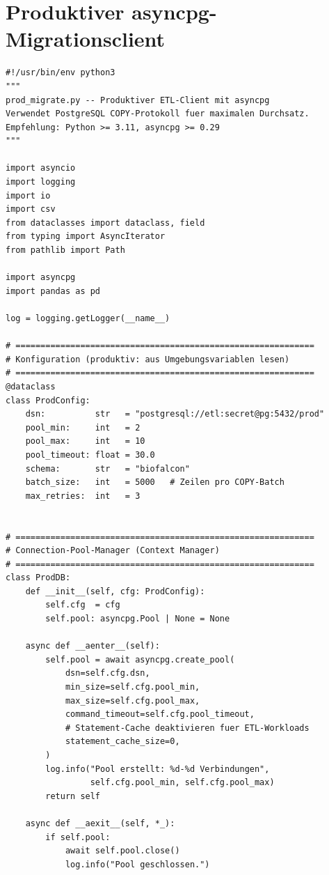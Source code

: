 \documentclass[12pt,a4paper]{report}
\theoremstyle{definition}
\theoremstyle{remark}
\begin{document}
\section{Produktiver asyncpg-Migrationsclient}

\begin{lstlisting}[style=python, caption={prod\_migrate.py: Asynchroner Produktiv-Client mit Connection Pool}, label=lst:asyncpg]
#!/usr/bin/env python3
"""
prod_migrate.py -- Produktiver ETL-Client mit asyncpg
Verwendet PostgreSQL COPY-Protokoll fuer maximalen Durchsatz.
Empfehlung: Python >= 3.11, asyncpg >= 0.29
"""

import asyncio
import logging
import io
import csv
from dataclasses import dataclass, field
from typing import AsyncIterator
from pathlib import Path

import asyncpg
import pandas as pd

log = logging.getLogger(__name__)

# ============================================================
# Konfiguration (produktiv: aus Umgebungsvariablen lesen)
# ============================================================
@dataclass
class ProdConfig:
    dsn:          str   = "postgresql://etl:secret@pg:5432/prod"
    pool_min:     int   = 2
    pool_max:     int   = 10
    pool_timeout: float = 30.0
    schema:       str   = "biofalcon"
    batch_size:   int   = 5000   # Zeilen pro COPY-Batch
    max_retries:  int   = 3


# ============================================================
# Connection-Pool-Manager (Context Manager)
# ============================================================
class ProdDB:
    def __init__(self, cfg: ProdConfig):
        self.cfg  = cfg
        self.pool: asyncpg.Pool | None = None

    async def __aenter__(self):
        self.pool = await asyncpg.create_pool(
            dsn=self.cfg.dsn,
            min_size=self.cfg.pool_min,
            max_size=self.cfg.pool_max,
            command_timeout=self.cfg.pool_timeout,
            # Statement-Cache deaktivieren fuer ETL-Workloads
            statement_cache_size=0,
        )
        log.info("Pool erstellt: %d-%d Verbindungen",
                 self.cfg.pool_min, self.cfg.pool_max)
        return self

    async def __aexit__(self, *_):
        if self.pool:
            await self.pool.close()
            log.info("Pool geschlossen.")



\end{lstlisting}
\end{document}
